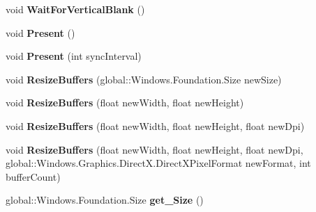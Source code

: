 \begin{DoxyCompactItemize}
void {\bfseries Wait\+For\+Vertical\+Blank} ()
\item 
\mbox{\label{interface_microsoft_1_1_graphics_1_1_canvas_1_1_i_canvas_swap_chain_a6489739742b77ba79f394f7b1311ac1b}} 
void {\bfseries Present} ()
\item 
\mbox{\label{interface_microsoft_1_1_graphics_1_1_canvas_1_1_i_canvas_swap_chain_a5f5e56503e7a70b7906c91353fd467ab}} 
void {\bfseries Present} (int sync\+Interval)
\item 
\mbox{\label{interface_microsoft_1_1_graphics_1_1_canvas_1_1_i_canvas_swap_chain_ae135e097979c890c9f71993cda7bf5e8}} 
void {\bfseries Resize\+Buffers} (global\+::\+Windows.\+Foundation.\+Size new\+Size)
\item 
\mbox{\label{interface_microsoft_1_1_graphics_1_1_canvas_1_1_i_canvas_swap_chain_abe1c3be982ca2df843e023c1cc00a5e2}} 
void {\bfseries Resize\+Buffers} (float new\+Width, float new\+Height)
\item 
\mbox{\label{interface_microsoft_1_1_graphics_1_1_canvas_1_1_i_canvas_swap_chain_a5307556d0590b5e0fd34934a6dcd76bd}} 
void {\bfseries Resize\+Buffers} (float new\+Width, float new\+Height, float new\+Dpi)
\item 
\mbox{\label{interface_microsoft_1_1_graphics_1_1_canvas_1_1_i_canvas_swap_chain_a55aab11b10079cee86acafefd5965e0a}} 
void {\bfseries Resize\+Buffers} (float new\+Width, float new\+Height, float new\+Dpi, global\+::\+Windows.\+Graphics.\+Direct\+X.\+Direct\+X\+Pixel\+Format new\+Format, int buffer\+Count)
\item 
\mbox{\label{interface_microsoft_1_1_graphics_1_1_canvas_1_1_i_canvas_swap_chain_a3c83b45bda7aaacd98cc90d21075f30c}} 
global\+::\+Windows.\+Foundation.\+Size {\bfseries get\+\_\+\+Size} ()
\item 

\end{DoxyCompactItemize}
